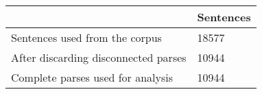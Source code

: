 	\begin{tabular}{|l|l|}
		\hline
	 & Sentences \\ 
		\hline
		Sentences used from the corpus & 18577\\ 
		\hline
		After discarding disconnected parses & 10944\\ 
		\hline
		Complete parses used for analysis & 10944\\ 
		\hline
	\end{tabular}
